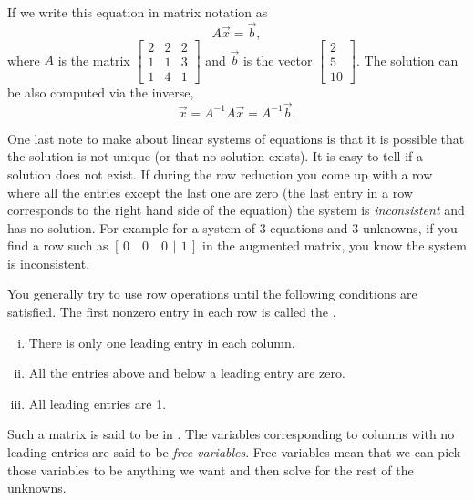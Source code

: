 \documentclass[12pt]{book}
\begin{document}
If we write this equation in matrix notation as
\begin{equation*}
A \vec{x} = \vec{b} ,
\end{equation*}
where $A$ is the matrix
$\left[ \begin{smallmatrix}
2 & 2 & 2 \\
1 & 1 & 3 \\
1 & 4 & 1 
\end{smallmatrix} \right]$ and $\vec{b}$ is the vector
$\left[ \begin{smallmatrix}
2 \\
5 \\
10
\end{smallmatrix} \right]$.  The solution can be also computed via the
inverse,
\begin{equation*}
\vec{x} = A^{-1} A \vec{x} = A^{-1} \vec{b} .
\end{equation*}

\medskip

One last note to make about linear systems of equations is that it is
possible that the solution is not unique (or that no solution exists).
It is easy to tell if a solution does not exist.  If during the row
reduction you come up with a row where all the entries except the last one
are zero (the last entry in a row corresponds to the right hand side of the
equation) the system is \emph{inconsistent} and
has no solution.  For
example for a system of 3 equations and 3 unknowns, if you find a row
such as $[\,0 \quad 0 \quad 0 ~\,|\,~ 1\,]$ in the augmented matrix,
you know the system is inconsistent.

\medskip

You generally try to use row operations until the following conditions
are satisfied.  The first nonzero entry in each row is called the
\emph{}.
\begin{enumerate}[(i)]
\item There is only one leading entry in each column.
\item All the entries above and below a leading entry are zero.
\item All leading entries are 1.
\end{enumerate}
Such a matrix is said to be in
\emph{}.  The variables
corresponding to columns with no leading entries are said to be
\emph{free variables}.
Free variables mean that we can pick those variables
to be anything we want and then solve for the rest of the unknowns.
\end{document}

